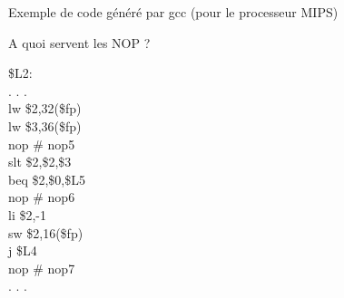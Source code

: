 %
\begin{Frame}{Exemple de code g\'en\'er\'e par gcc (pour le processeur MIPS)}

 
	\begin{block} {A quoi servent les NOP ?}

\$L2:\\
\hspace{0,5cm} . . .\\
\hspace{0,5cm} lw \hspace{0,5cm}\$2,32(\$fp) \\
\hspace{0,5cm} lw \hspace{0,5cm}\$3,36(\$fp)\\
\hspace{0,5cm} \textcolor{tagada}{nop} 	\hspace{0,99cm}\# nop5\\
\hspace{0,5cm} slt   \hspace{0,5cm}\$2,\$2,\$3\\
\hspace{0,5cm} beq \hspace{0,35cm}\$2,\$0,\$L5\\
\hspace{0,5cm} \textcolor{tagada}{nop}		\hspace{0,99cm}\# nop6\\
\hspace{0,5cm} li    \hspace{0,7cm}\$2,-1\\
\hspace{0,5cm} sw   \hspace{0,5cm}\$2,16(\$fp)\\
\hspace{0,5cm} j      \hspace{0,8cm}\$L4\\
\hspace{0,5cm} \textcolor{tagada}{nop}	\hspace{0,99cm}\# nop7\\
\hspace{0,5cm} . . .\\

\end{block}


      
\end{Frame}


